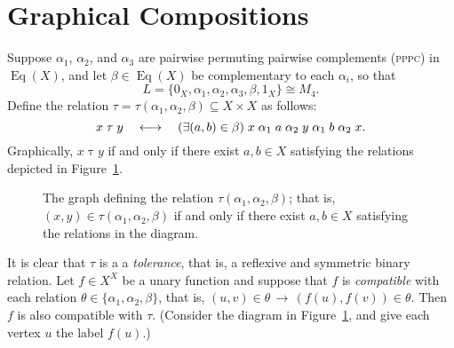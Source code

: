 \documentclass{amsart}
\theoremstyle{plain}
\theoremstyle{definition}
\theoremstyle{definition}
\numberwithin{equation}{section}
\newcommand{\<}{\ensuremath{\langle}}
\renewcommand{\>}{\ensuremath{\rangle}}
\newcommand{\Eq}{\ensuremath{\operatorname{Eq}}}
\newcommand{\rel}{\ensuremath{\mathrel}}
\newcommand{\PPPC}{\textsc{pppc}\xspace}
\begin{document}
\section{Graphical Compositions}
Suppose $\alpha_1$, $\alpha_2$, and $\alpha_3$ are pairwise permuting pairwise
complements (\PPPC) in $\Eq(X)$, and let $\beta\in \Eq(X)$ be complementary to
each 
$\alpha_i$, so that 
\[
L = \{0_X, \alpha_1, \alpha_2, \alpha_3, \beta, 1_X\} \cong M_4.
\]  
Define the relation $\tau=\tau(\alpha_1, \alpha_2, \beta)\subseteq X\times X$ as
follows:
\[
x \mathrel{\tau} y \quad \longleftrightarrow \quad (\exists (a, b) \in \beta)\;  
x \rel{\alpha_1} a \rel{\alpha_2} y \rel{\alpha_1} b \rel{\alpha_2} x.
\]
Graphically, $x \mathrel{\tau} y$ if and only if there exist $a, b \in X$
satisfying the relations depicted in Figure~\ref{fig:rho}.

\newcommand\dotsize{1pt}
\begin{figure}
  \caption{The graph defining the relation $\tau(\alpha_1, \alpha_2, \beta)$;
    that is, $(x,y) \in \tau(\alpha_1, \alpha_2, \beta)$ if and only if there
    exist $a, b \in X$ satisfying the relations in the diagram.}
  \label{fig:rho}
\end{figure}

It is clear that $\tau$ is a a \emph{tolerance}, that is, a reflexive and symmetric binary relation.
Let $f\in X^X$ be a unary function and suppose that $f$ is \emph{compatible} with each
relation $\theta \in \{\alpha_1, \alpha_2, \beta\}$, that is, 
$(u,v)\in \theta \, \longrightarrow \, (f(u), f(v))\in \theta$.  Then $f$ is also
compatible with $\tau$. (Consider the diagram in Figure~\ref{fig:rho}, and give
each vertex $u$ the label $f(u)$.)
\end{document}
